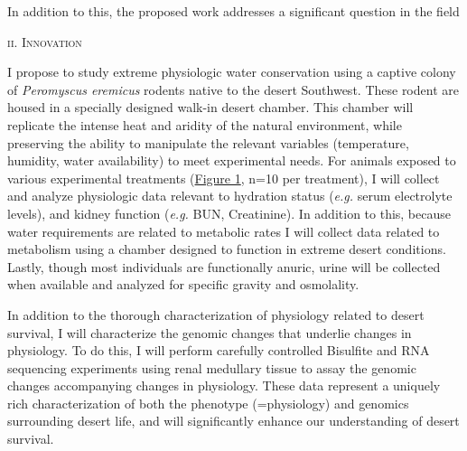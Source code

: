\documentclass[11pt]{article}
\begin{document}
In addition to this, the proposed work addresses a significant question in the field 






\normalsize 
\begin{center}
\textsc{{ii. Innovation}} \\
\end{center}


I propose to study extreme physiologic water conservation using a captive colony of \textit{Peromyscus eremicus} rodents native to the desert Southwest. These rodent are housed in a specially designed walk-in desert chamber. This chamber will replicate the intense heat and aridity of the natural environment, while preserving the ability to manipulate the relevant variables (temperature, humidity, water availability) to meet experimental needs. For animals exposed to various experimental treatments (\hyperlink{Figure 1}{Figure 1}, n=10 per treatment), I will collect and analyze physiologic data relevant to hydration status (\textit{e.g.} serum electrolyte levels), and kidney function (\textit{e.g.} BUN, Creatinine). In addition to this, because water requirements are related to metabolic rates I will collect data related to metabolism using a chamber designed to function in extreme desert conditions. Lastly, though most individuals are functionally anuric, urine will be collected when available and analyzed for specific gravity and osmolality. 

In addition to the thorough characterization of physiology related to desert survival, I will characterize the genomic changes that underlie changes in physiology. To do this, I will perform carefully controlled Bisulfite and RNA sequencing experiments using renal medullary tissue to assay the genomic changes accompanying changes in physiology. These data represent a uniquely rich characterization of both the phenotype (=physiology) and genomics surrounding desert life, and will significantly enhance our understanding of desert survival. 
\end{document}
